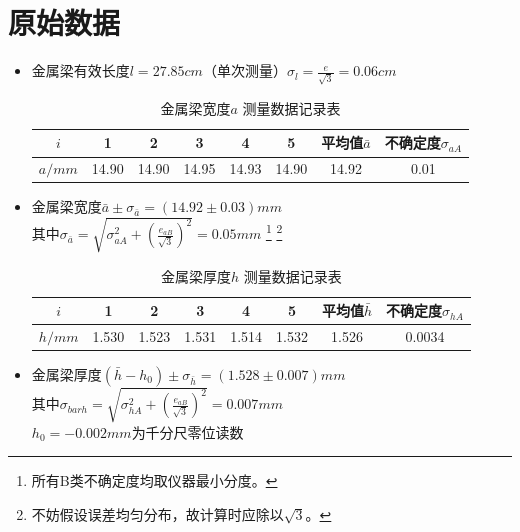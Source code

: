 \documentclass[12pt, a4paper]{ctexart}
\begin{document}
\section{原始数据}
\begin{itemize}
	\item 金属梁有效长度$l = 27.85cm$（单次测量）\quad $\sigma_l = \frac e{\sqrt3} = 0.06cm $

	\begin{table}[htbp]
    \centering
    \caption{金属梁宽度$a$ \quad 测量数据记录表}
    \begin{tabular}{cccccccc}
	\toprule
    $i$     & 1     & 2     & 3     & 4     & 5     & 平均值$\bar{a}$   & 不确定度$\sigma_{aA}$  \\
    \midrule
    $a/mm$  & 14.90 & 14.90 & 14.95 & 14.93 & 14.90 & 14.92 & 0.01 \\
	\bottomrule
    \end{tabular}%
    \label{tab:t1}%
    \end{table}%

	\item 金属梁宽度$\bar{a} \pm \sigma_{\bar{a}} = (14.92 \pm 0.03)mm$ \\
    其中$\displaystyle{\sigma_{\bar{a}} = \sqrt{\sigma_{aA}^2 + (\frac{e_{aB}}{\sqrt{3}})^2 } = 0.05mm}$
	\footnote{所有B类不确定度均取仪器最小分度。}
	\footnote{不妨假设误差均匀分布，故计算时应除以$\sqrt3$。} \\

    \begin{table}[htbp]
    \centering
    \begin{tabular}{cccccccc}
    \toprule
    $i$     & 1      & 2     & 3     & 4     & 5     & 平均值$\bar{h}$ & 不确定度$\sigma_{hA}$ \\
    \midrule
    $h/mm$  & 1.530  & 1.523 & 1.531 & 1.514 & 1.532 & 1.526 & 0.0034 \\
    \bottomrule
    \end{tabular}%
	\caption{金属梁厚度$h$ \quad 测量数据记录表}
    \label{tab:t2}%
    \end{table}%

    \item 金属梁厚度$(\bar{h} - h_0) \pm \sigma_{\bar{h}} = (1.528 \pm 0.007)mm $ \\
    其中$\displaystyle{\sigma_{bar{h}} = \sqrt{\sigma_{hA}^2 + (\frac{e_{aB}}{\sqrt{3}})^2 } = 0.007mm}$ \\
	$h_0 = -0.002mm$为千分尺零位读数


\end{itemize}
\end{document}

